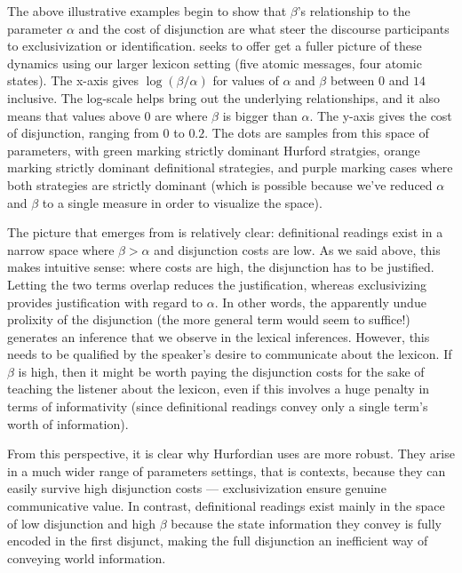 \documentclass{article}
\begin{document}
The above illustrative examples begin to show that $\beta$'s
relationship to the parameter $\alpha$ and the cost of disjunction are
what steer the discourse participants to exclusivization or
identification.  seeks to offer get a fuller picture
of these dynamics using our larger lexicon setting (five atomic
messages, four atomic states). The x-axis gives $\log(\beta/\alpha)$
for values of $\alpha$ and $\beta$ between $0$ and $14$ inclusive. The
log-scale helps bring out the underlying relationships, and it also
means that values above $0$ are where $\beta$ is bigger than
$\alpha$. The y-axis gives the cost of disjunction, ranging from $0$
to $0.2$. The dots are samples from this space of parameters, with
green marking strictly dominant Hurford stratgies, orange marking
strictly dominant definitional strategies, and purple marking cases
where both strategies are strictly dominant (which is possible because
we've reduced $\alpha$ and $\beta$ to a single measure in order to
visualize the space).

The picture that emerges from  is relatively clear:
definitional readings exist in a narrow space where $\beta > \alpha$
and disjunction costs are low. As we said above, this makes intuitive
sense: where costs are high, the disjunction has to be
justified. Letting the two terms overlap reduces the justification,
whereas exclusivizing provides justification with regard to
$\alpha$. In other words, the apparently undue prolixity of the
disjunction (the more general term would seem to suffice!) generates
an inference that we observe in the lexical inferences. However, this
needs to be qualified by the speaker's desire to communicate about the
lexicon. If $\beta$ is high, then it might be worth paying the
disjunction costs for the sake of teaching the listener about the
lexicon, even if this involves a huge penalty in terms of
informativity (since definitional readings convey only a single term's
worth of information).

From this perspective, it is clear why Hurfordian uses are more
robust. They arise in a much wider range of parameters settings, that
is contexts, because they can easily survive high disjunction costs
--- exclusivization ensure genuine communicative value. In contrast,
definitional readings exist mainly in the space of low disjunction and
high $\beta$ because the state information they convey is fully
encoded in the first disjunct, making the full disjunction an
inefficient way of conveying world information.
\end{document}
